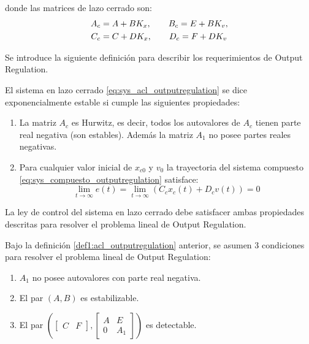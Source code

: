 donde las matrices de lazo cerrado son:
\begin{align}
    A_c & = A + B K_x, \qquad B_c = E + B K_v, \notag \\
    C_c & = C + D K_x, \qquad D_c = F + D K_v 
\end{align}

Se introduce la siguiente definición para describir los requerimientos de Output Regulation.
\begin{mybox}{}
    \begin{definition} \label{def1:acl_outputregulation}
        El sistema en lazo cerrado \eqref{eq:sys_acl_outputregulation} se dice exponencialmente estable si cumple las siguientes propiedades:
        \begin{enumerate}[leftmargin=*, labelindent=1em, label=\textbf{Propiedad \thedefinition.\arabic*}]
            \item \label{def_prop1.1} La matriz $A_c$ es Hurwitz, es decir, todos los autovalores de $A_c$ tienen parte real negativa (son estables). Además la matriz $A_1$ no posee partes reales negativas.
            \item \label{def_prop1.2} Para cualquier valor inicial de $x_{c0}$ y $v_0$ la trayectoria del sistema compuesto \eqref{eq:sys_compuesto_outputregulation} satisface:
            \begin{equation}
                \lim_{t\to \infty} e(t) = \lim_{t \to \infty} (C_c x_c(t)+D_c v(t)) = 0
            \end{equation}
        \end{enumerate}
        La ley de control del sistema en lazo cerrado debe satisfacer ambas propiedades descritas para resolver el problema lineal de Output Regulation.
    \end{definition}
\end{mybox}

\begin{assumption}
\label{assum1:regulation_assumption}
    Bajo la definición \ref{def1:acl_outputregulation} anterior, se asumen 3 condiciones para resolver el problema lineal de Output Regulation:
    \begin{enumerate}[leftmargin=*, labelindent=1em, label=\textbf{(\theassumption.\alph*)}]
        \item \label{assum1.1} $A_1$ no posee autovalores con parte real negativa. 
        \item \label{assum1.2} El par $(A,B)$ es estabilizable. 
        \item El par $\left( \begin{bmatrix} C & F \end{bmatrix}, \begin{bmatrix} A & E \\ 0 & A_1 \end{bmatrix} \right)$ es detectable.
    \end{enumerate}
\end{assumption}

